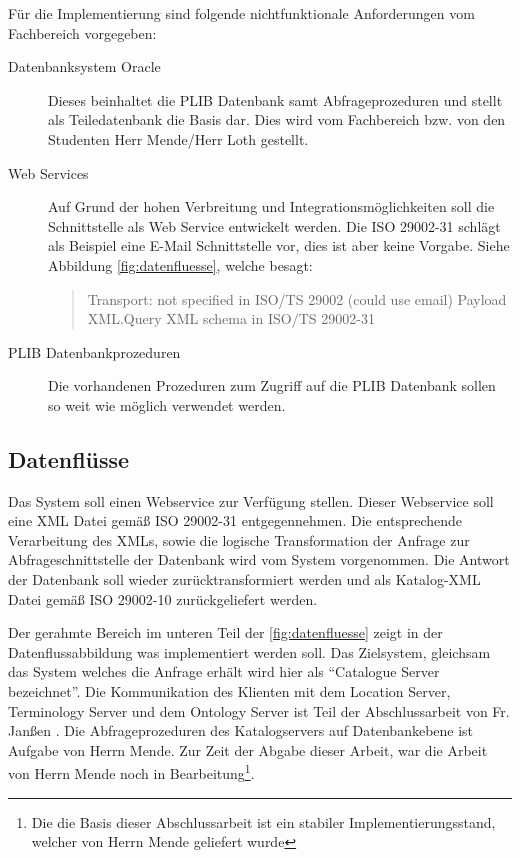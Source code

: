 Für die Implementierung sind folgende nichtfunktionale Anforderungen vom Fachbereich vorgegeben:
\begin{description}
\item[Datenbanksystem Oracle] Dieses beinhaltet die PLIB Datenbank samt Abfrageprozeduren und stellt als Teiledatenbank die Basis dar. Dies wird vom Fachbereich bzw. von den Studenten Herr Mende/Herr Loth gestellt.
\item[Web Services] Auf Grund der hohen Verbreitung und Integrationsmöglichkeiten soll die Schnittstelle als Web Service entwickelt werden. Die ISO 29002-31 schlägt als Beispiel eine E-Mail Schnittstelle vor, dies ist aber keine Vorgabe. Siehe Abbildung \autoref{fig:datenfluesse}, welche besagt:
\begin{quotation}
Transport: not specified in ISO/TS 29002 (could use email) Payload XML.Query XML schema in ISO/TS 29002-31
\end{quotation}
\item[PLIB Datenbankprozeduren] Die vorhandenen Prozeduren zum Zugriff auf die PLIB Datenbank sollen so weit wie möglich verwendet werden. 
\end{description}

\subsection{Datenflüsse}
Das System soll einen \gls{Webservice} zur Verfügung stellen. Dieser \gls{Webservice} soll eine XML Datei gemäß ISO 29002-31 entgegennehmen. Die entsprechende Verarbeitung des XMLs, sowie die logische Transformation der Anfrage zur Abfrageschnittstelle der Datenbank wird vom System vorgenommen. Die Antwort der Datenbank soll wieder zurücktransformiert werden und als Katalog-XML Datei gemäß ISO 29002-10 zurückgeliefert werden.
 
Der gerahmte Bereich im unteren Teil der \autoref{fig:datenfluesse} zeigt in der Datenflussabbildung was implementiert werden soll. Das Zielsystem, gleichsam das System welches die Anfrage erhält wird hier als \enquote{Catalogue Server bezeichnet}. 
Die Kommunikation des Klienten mit dem Location Server, Terminology Server und dem Ontology Server ist Teil der Abschlussarbeit von Fr. Janßen \citep[Vergl.][]{janssen}. 
Die Abfrageprozeduren des Katalogservers auf Datenbankebene ist Aufgabe von Herrn Mende. Zur Zeit der Abgabe dieser Arbeit, war die Arbeit von Herrn Mende noch in Bearbeitung\footnote{Die die Basis dieser Abschlussarbeit ist ein stabiler Implementierungsstand, welcher von Herrn Mende geliefert wurde}. 


